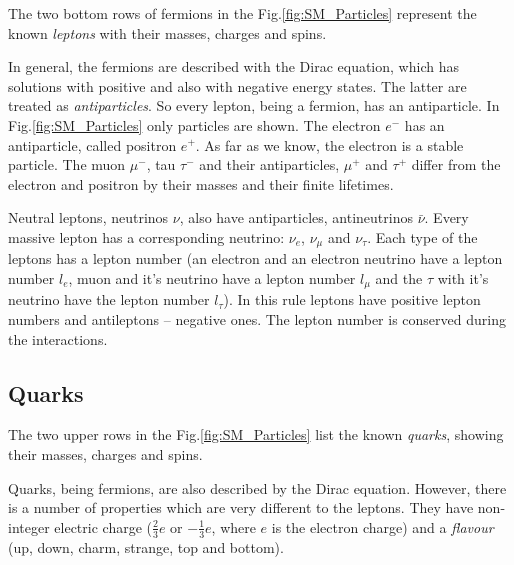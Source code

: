The two bottom rows of fermions in the Fig.\ref{fig:SM_Particles} represent the known \textit{leptons} with their masses, charges
and spins. 

In general, the fermions are described with the Dirac equation\cite{diraceq}, which has 
% 
% 
solutions with positive and also with negative energy states. The latter are treated
as \textit{antiparticles}. So every lepton, being a fermion, has an antiparticle. In Fig.\ref{fig:SM_Particles}
only particles are shown. The electron $e^{-}$ has an antiparticle, called positron $e^{+}$. As far as we know,
the electron is a stable particle. The muon $\mu^{-}$, tau $\tau^{-}$ and
their antiparticles, $\mu^{+}$ and $\tau^{+}$ differ from the electron and positron by their masses and their finite lifetimes.

Neutral leptons, neutrinos $\nu$, also have antiparticles, antineutrinos $\bar{\nu}$. Every massive lepton has a corresponding
neutrino: $\nu_{e}$, $\nu_{\mu}$ and $\nu_{\tau}$. Each type of the leptons has a lepton number (an electron and an electron neutrino 
have a lepton number $l_{e}$, muon and it's neutrino have a lepton number $l_{\mu}$ and the $\tau$ with it's neutrino have the 
lepton number $l_{\tau}$).  In this rule leptons have positive lepton numbers and
antileptons -- negative ones. The lepton number is conserved during the interactions.

\subsection{Quarks}\label{sec:quark}

The two upper rows in the Fig.\ref{fig:SM_Particles} list the known \textit{quarks}, showing their masses, charges and spins.

Quarks, being fermions, are also described by the Dirac equation. However, there is a number of properties which are very different
to the leptons. They have non-integer electric charge ($\frac{2}{3} e$ or $-\frac{1}{3} e$, where $e$ is the electron charge) and a 
\textit{flavour} (up, down, charm, strange, top and bottom).

